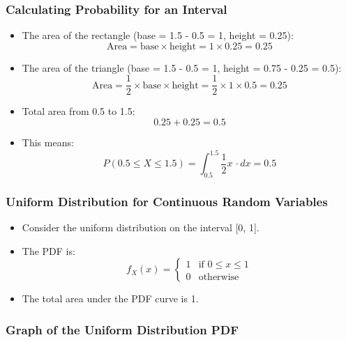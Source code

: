 \documentclass[handout]{beamer} %
\begin{document}
\begin{frame}
\frametitle{Calculating Probability for an Interval}

    \begin{itemize}
        \item The area of the rectangle (base = 1.5 - 0.5 = 1, height = 0.25):
        \[
        \text{Area} = \text{base} \times \text{height} = 1 \times 0.25 = 0.25
        \] \pause
        \item The area of the triangle (base = 1.5 - 0.5 = 1, height = 0.75 - 0.25 = 0.5):
        \[
        \text{Area} = \frac{1}{2} \times \text{base} \times \text{height} = \frac{1}{2} \times 1 \times 0.5 = 0.25
        \] \pause
        \item Total area from 0.5 to 1.5:
        \[
        0.25 + 0.25 = 0.5
        \] \pause
        \item This means:
        \[
        P(0.5 \leq X \leq 1.5) = \int_{0.5}^{1.5} \frac{1}{2}x \, \cdot dx = 0.5
        \]
    \end{itemize}
\end{frame}

\begin{frame}
\frametitle{Uniform Distribution for Continuous Random Variables}
    \begin{itemize}
        \item Consider the uniform distribution on the interval [0, 1]. \pause
        \item The PDF is: \pause
        \[
        f_X(x) = \begin{cases}
        1 & \text{if } 0 \leq x \leq 1 \\
        0 & \text{otherwise}
        \end{cases}
        \] \pause
        \item The total area under the PDF curve is 1.
    \end{itemize}
\end{frame}

\begin{frame}
\frametitle{Graph of the Uniform Distribution PDF}
\end{frame}
\end{document}
